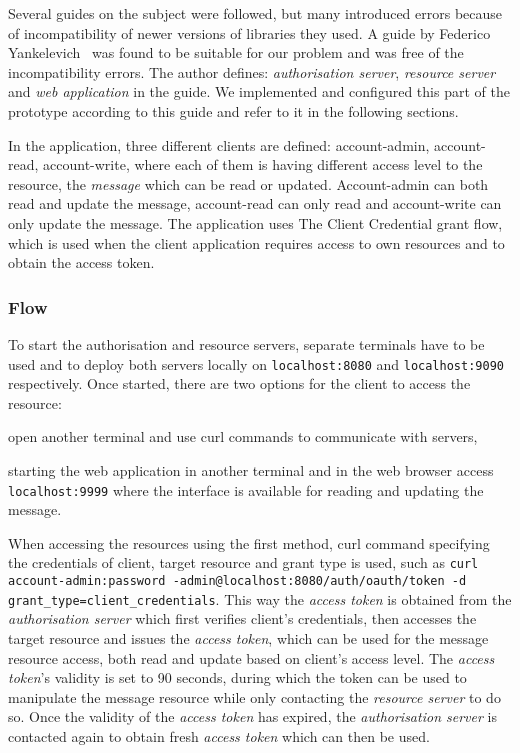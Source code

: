 Several guides on the subject were followed, but many introduced errors because of incompatibility of newer versions of libraries they used. A guide by Federico Yankelevich~\cite{Yankelevich2016OAuth2Enterprises} was found to be suitable for our problem and was free of the incompatibility errors. The author defines: \textit{authorisation server}, \textit{resource server} and \textit{web application} in the guide. We implemented and configured this part of the prototype according to this guide and refer to it in the following sections.
% 

In the application, three different clients are defined: account-admin, account-read, account-write, where each of them is having different access level to the resource, the \textit{message} which can be read or updated. Account-admin can both read and update the message, account-read can only read and account-write can only update the message. The application uses The Client Credential grant flow, which is used when the client application requires access to own resources and to obtain the access token.

\subsubsection{Flow}
To start the authorisation and resource servers, separate terminals have to be used and to deploy both servers locally on \texttt{localhost:8080} and \texttt{localhost:9090} respectively. Once started, there are two options for the client to access the resource:
% 
\begin{enumerate*}[label=(\roman*)]
    \item open another terminal and use \acrshort{curl} commands to communicate with servers, 
    \item starting the web application in another terminal and in the web browser access \texttt{localhost:9999} where the interface is available for reading and updating the message.
\end{enumerate*}

When accessing the resources using the first method, \acrshort{curl} command specifying the credentials of client, target resource and grant type is used, such as \texttt{curl account-admin:password -admin@localhost:8080/auth/oauth/token -d grant\_type=client\_credentials}. This way the \textit{access token} is obtained from the \textit{authorisation server} which first verifies client's credentials, then accesses the target resource and issues the \textit{access token}, which can be used for the message resource access, both read and update based on client's access level. The \textit{access token}'s validity is set to 90 seconds, during which the token can be used to manipulate the message resource while only contacting the \textit{resource server} to do so. Once the validity of the \textit{access token} has expired, the \textit{authorisation server} is contacted again to obtain fresh \textit{access token} which can then be used.

